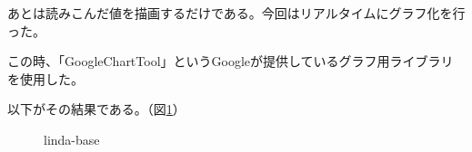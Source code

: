 \hspace{30mm} 

あとは読みこんだ値を描画するだけである。今回はリアルタイムにグラフ化を行った。

この時、「GoogleChartTool」というGoogleが提供しているグラフ用ライブラリを使用した。

以下がその結果である。（図\ref{fig:10}）
\hspace{30mm}

\begin{figure}[htbp]
    \begin{center}
    \end{center}
    \caption{linda-base}
    \label{fig:10}
\end{figure}







